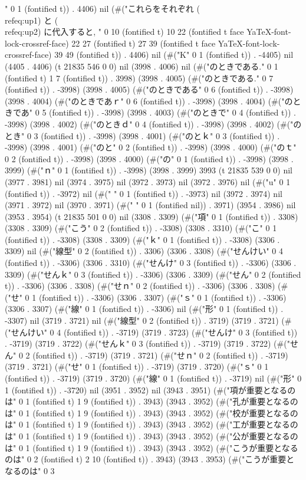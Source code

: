 " 0 1 (fontified t)) . 4406) nil (#("これらをそれぞれ (\\ref{eq:up1}) と (\\ref{eq:up2}) に代入すると, " 0 10 (fontified t) 10 22 (fontified t face YaTeX-font-lock-crossref-face) 22 27 (fontified t) 27 39 (fontified t face YaTeX-font-lock-crossref-face) 39 49 (fontified t)) . 4406) nil (#("K" 0 1 (fontified t)) . -4405) nil (4405 . 4406) (t 21835 546 0 0) nil (3998 . 4006) nil (#("のときである." 0 1 (fontified t) 1 7 (fontified t)) . 3998) (3998 . 4005) (#("のときである." 0 7 (fontified t)) . -3998) (3998 . 4005) (#("のときである" 0 6 (fontified t)) . -3998) (3998 . 4004) (#("のときであｒ" 0 6 (fontified t)) . -3998) (3998 . 4004) (#("のときであ" 0 5 (fontified t)) . -3998) (3998 . 4003) (#("のときで" 0 4 (fontified t)) . -3998) (3998 . 4002) (#("のときｄ" 0 4 (fontified t)) . -3998) (3998 . 4002) (#("のとき" 0 3 (fontified t)) . -3998) (3998 . 4001) (#("のとｋ" 0 3 (fontified t)) . -3998) (3998 . 4001) (#("のと" 0 2 (fontified t)) . -3998) (3998 . 4000) (#("のｔ" 0 2 (fontified t)) . -3998) (3998 . 4000) (#("の" 0 1 (fontified t)) . -3998) (3998 . 3999) (#("ｎ" 0 1 (fontified t)) . -3998) (3998 . 3999) 3993 (t 21835 539 0 0) nil (3977 . 3981) nil (3974 . 3975) nil (3972 . 3973) nil (3972 . 3976) nil (#("u" 0 1 (fontified t)) . -3972) nil (#(" " 0 1 (fontified t)) . -3973) nil (3972 . 3974) nil (3971 . 3972) nil (3970 . 3971) (#(" " 0 1 (fontified nil)) . 3971) (3954 . 3986) nil (3953 . 3954) (t 21835 501 0 0) nil (3308 . 3309) (#("項" 0 1 (fontified t)) . 3308) (3308 . 3309) (#("こう" 0 2 (fontified t)) . -3308) (3308 . 3310) (#("こ" 0 1 (fontified t)) . -3308) (3308 . 3309) (#("ｋ" 0 1 (fontified t)) . -3308) (3306 . 3309) nil (#("線型" 0 2 (fontified t)) . 3306) (3306 . 3308) (#("せんけい" 0 4 (fontified t)) . -3306) (3306 . 3310) (#("せんけ" 0 3 (fontified t)) . -3306) (3306 . 3309) (#("せんｋ" 0 3 (fontified t)) . -3306) (3306 . 3309) (#("せん" 0 2 (fontified t)) . -3306) (3306 . 3308) (#("せｎ" 0 2 (fontified t)) . -3306) (3306 . 3308) (#("せ" 0 1 (fontified t)) . -3306) (3306 . 3307) (#("ｓ" 0 1 (fontified t)) . -3306) (3306 . 3307) (#("線" 0 1 (fontified t)) . -3306) nil (#("形" 0 1 (fontified t)) . -3307) nil (3719 . 3721) nil (#("線型" 0 2 (fontified t)) . 3719) (3719 . 3721) (#("せんけい" 0 4 (fontified t)) . -3719) (3719 . 3723) (#("せんけ" 0 3 (fontified t)) . -3719) (3719 . 3722) (#("せんｋ" 0 3 (fontified t)) . -3719) (3719 . 3722) (#("せん" 0 2 (fontified t)) . -3719) (3719 . 3721) (#("せｎ" 0 2 (fontified t)) . -3719) (3719 . 3721) (#("せ" 0 1 (fontified t)) . -3719) (3719 . 3720) (#("ｓ" 0 1 (fontified t)) . -3719) (3719 . 3720) (#("線" 0 1 (fontified t)) . -3719) nil (#("形" 0 1 (fontified t)) . -3720) nil (3951 . 3952) nil (3943 . 3951) (#("項が重要となるのは" 0 1 (fontified t) 1 9 (fontified t)) . 3943) (3943 . 3952) (#("孔が重要となるのは" 0 1 (fontified t) 1 9 (fontified t)) . 3943) (3943 . 3952) (#("校が重要となるのは" 0 1 (fontified t) 1 9 (fontified t)) . 3943) (3943 . 3952) (#("工が重要となるのは" 0 1 (fontified t) 1 9 (fontified t)) . 3943) (3943 . 3952) (#("公が重要となるのは" 0 1 (fontified t) 1 9 (fontified t)) . 3943) (3943 . 3952) (#("こうが重要となるのは" 0 2 (fontified t) 2 10 (fontified t)) . 3943) (3943 . 3953) (#("こうが重要となるのは" 0 3 